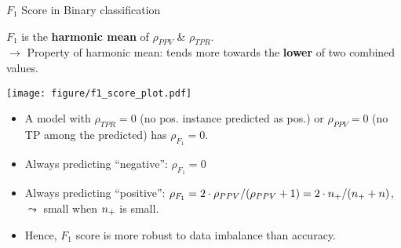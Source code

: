 \documentclass[11pt,compress,t,notes=noshow, xcolor=table]{beamer}
\begin{document}
\begin{vbframe}{$F_1$ Score in Binary classification}
	\footnotesize{
	
    	\begin{minipage}[c]{0.5\textwidth}
    		$F_1$ is the \textbf{harmonic mean} of $\rho_{PPV}$ \& $\rho_{TPR}$. \\
    		$\rightarrow$ Property of harmonic mean: tends more towards the \textbf{lower} of two combined values.
    	\end{minipage}%
    	\begin{minipage}[c]{0.5\textwidth}
    		\centering
    		\texttt{[image: figure/f1\_score\_plot.pdf]}
    	\end{minipage}
	
    	\begin{itemize}
    		\item A model with $\rho_{TPR} = 0$ (no pos. instance predicted as 
    		pos.) or 
    		$\rho_{PPV} = 0$ (no TP among the predicted) has $\rho_{F_1} = 0$.
      
    		\item Always predicting \enquote{negative}: $\rho_{F_1} = 0$
      
    		\item Always predicting \enquote{positive}: $\rho_{F_1} = 2 \cdot \rho_{PPV} / 
    		(\rho_{PPV} + 1) = 2 \cdot n_{+} / (n_{+} + n)$,\\ 
    		$\leadsto$ small when $n_{+}$ is small.
    
            \item Hence, $F_1$ score is more robust to data imbalance than accuracy.
      
    	\end{itemize}
	}
\end{vbframe}
\end{document}
